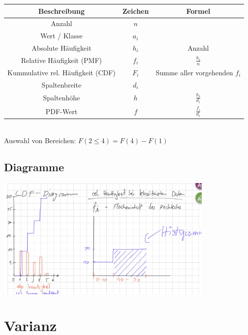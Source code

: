 \documentclass{article}
\begin{document}
\begin{tabular}{|c c c|} 
 \hline
 Beschreibung & Zeichen & Formel\\
 \hline
	
		Anzahl &
		$ n $ &
		\\ 
 	\hline
	
	
		Wert / Klasse &
		$ a_i $  &
		\\
 	\hline
 
 		Absolute H\"aufigkeit &
 		$ h_i $ &
 		Anzahl
 		\\
 	\hline

		Relative Häufigkeit (PMF) &
		$ f_i $ &
		$ \frac{h_i}{n} $ 
		\\
	\hline
	
 		Kummulative rel. H\"aufigkeit (CDF) & 
 		$F_i$ &
 		Summe aller vorgehenden $f_i$
 		\\
	\hline
	
		Spaltenbreite &
		$ d_i $ & 
		\\
	\hline
	
		Spaltenhöhe &
		$ h $ &
		$ \frac{h_i}{d_i} $
		\\
	\hline
	
		PDF-Wert &
		$f$ &
		$ \frac{f_i}{d_i} $
		\\
	\hline
	
\end{tabular} \\

	Auswahl von Bereichen: 
	$
	F(2 \leq 4) = F(4) - F(1)
	$
	


\subsection{Diagramme}

\includegraphics[height=6cm]{IMG_0205}


\section{Varianz}
\end{document}
